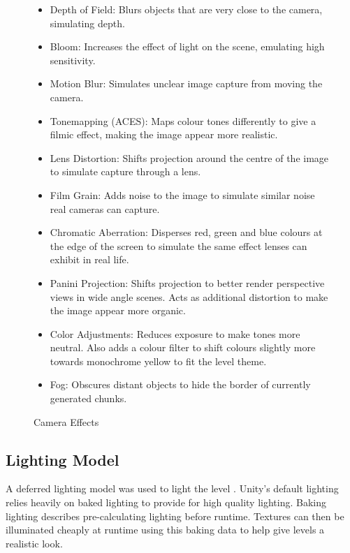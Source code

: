 \begin{figure}[H]
    \begin{framed}
        \begin{itemize}
            \item Depth of Field: Blurs objects that are very close to the camera, simulating depth.
            \item Bloom: Increases the effect of light on the scene, emulating high sensitivity.
            \item Motion Blur: Simulates unclear image capture from moving the camera.
            \item Tonemapping (ACES): Maps colour tones differently to give a filmic effect, making the image appear more realistic.
            \item Lens Distortion: Shifts projection around the centre of the image to simulate capture through a lens.
            \item Film Grain: Adds noise to the image to simulate similar noise real cameras can capture.
            \item Chromatic Aberration: Disperses red, green and blue colours at the edge of the screen to simulate the same effect lenses can exhibit in real life.
            \item Panini Projection: Shifts projection to better render perspective views in wide angle scenes. Acts as additional distortion to make the image appear more organic.
            \item Color Adjustments: Reduces exposure to make tones more neutral. Also adds a colour filter to shift colours slightly more towards monochrome yellow to fit the level theme.
            \item Fog: Obscures distant objects to hide the border of currently generated chunks.
        \end{itemize}
    \end{framed}
    \caption{Camera Effects}
    \label{fig:cameraEffects}
\end{figure}

\subsection{Lighting Model}
A deferred lighting model was used to light the level \cite{lighting_models}. Unity's default lighting relies heavily on baked lighting to provide for high quality lighting. Baking lighting describes pre-calculating lighting before runtime. Textures can then be illuminated cheaply at runtime using this baking data to help give levels a realistic look.

